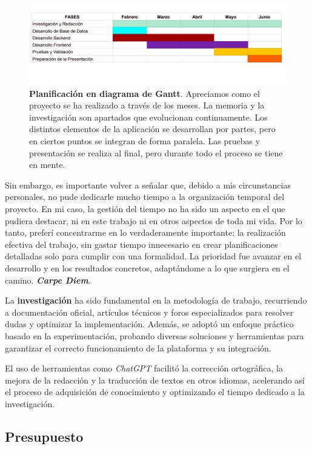 \begin{figure}[H]
	\centering
	\includegraphics[width=1\linewidth]{imagenes/diagrama.png}
	\caption[\textbf{Planificación en diagrama de Gantt}.]{\textbf{Planificación en diagrama de Gantt}. Apreciamos como el proyecto se ha realizado a través de los meses. La memoria y la investigación son apartados que evolucionan continuamente. Los distintos elementos de la aplicación se desarrollan por partes, pero en ciertos puntos se integran de forma paralela. Las pruebas y presentación se realiza al final, pero durante todo el proceso se tiene en mente.}
	\label{diagrama}
\end{figure}

Sin embargo, es importante volver a señalar que, debido a mis circunstancias personales, no pude dedicarle mucho tiempo a la organización temporal del proyecto. En mi caso, la gestión del tiempo no ha sido un aspecto en el que pudiera destacar, ni en este trabajo ni en otros aspectos de toda mi vida. Por lo tanto, preferí concentrarme en lo verdaderamente importante: la realización efectiva del trabajo, sin gastar tiempo innecesario en crear planificaciones detalladas solo para cumplir con una formalidad. La prioridad fue avanzar en el desarrollo y en los resultados concretos, adaptándome a lo que surgiera en el camino. \textit{\textbf{Carpe Diem}}.


La \textbf{investigación} ha sido fundamental en la metodología de trabajo, recurriendo a documentación oficial, artículos técnicos y foros especializados para resolver dudas y optimizar la implementación. Además, se adoptó un enfoque práctico basado en la experimentación, probando diversas soluciones y herramientas para garantizar el correcto funcionamiento de la plataforma y su integración.

El uso de herramientas como \textit{ChatGPT} facilitó la corrección ortográfica, la mejora de la redacción y la traducción de textos en otros idiomas, acelerando así el proceso de adquisición de conocimiento y optimizando el tiempo dedicado a la investigación.

\subsection{Presupuesto}

